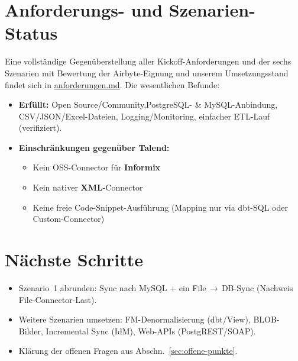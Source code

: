 \documentclass[a4paper,12pt]{article}
\begin{document}
\section{Anforderungs- und Szenarien-Status}
 
Eine vollständige Gegenüberstellung aller Kickoff-Anforderungen und der sechs
Szenarien mit Bewertung der Airbyte-Eignung und unserem Umsetzungsstand findet sich
in
\href{https://github.com/Timbo3399/INFM_Airbyte/blob/main/docs/anforderungen.md}{anforderungen.md}.
Die wesentlichen Befunde:
 
\begin{itemize}[noitemsep, leftmargin=*]
    \item \textbf{Erfüllt:} Open Source/Community,\linebreak PostgreSQL- \& MySQL-Anbindung,
          CSV/JSON/Excel-Dateien, Logging/Monitoring, einfacher ETL-Lauf (verifiziert).
    \item \textbf{Einschränkungen gegenüber Talend:}
    \begin{itemize}[noitemsep, leftmargin=*]
        \item Kein OSS-Connector für \textbf{Informix}
        \item Kein nativer \textbf{XML}-Connector
        \item Keine freie Code-Snippet-Ausführung
              (Mapping nur via dbt-SQL oder Custom-Connector)
    \end{itemize}
\end{itemize}
 
\section{Nächste Schritte}
 
\begin{itemize}[noitemsep, leftmargin=*]
    \item Szenario~1 abrunden: Sync nach MySQL + ein
          File\,$\rightarrow$\,DB-Sync (Nachweis File-Connector-Last).
    \item Weitere Szenarien umsetzen: FM-Denormalisierung (dbt/View),
          BLOB-Bilder, Incremental Sync (IdM), Web-APIs (PostgREST/SOAP).
    \item Klärung der offenen Fragen aus Abschn.~\ref{sec:offene-punkte}.
\end{itemize}
 
\end{document}
